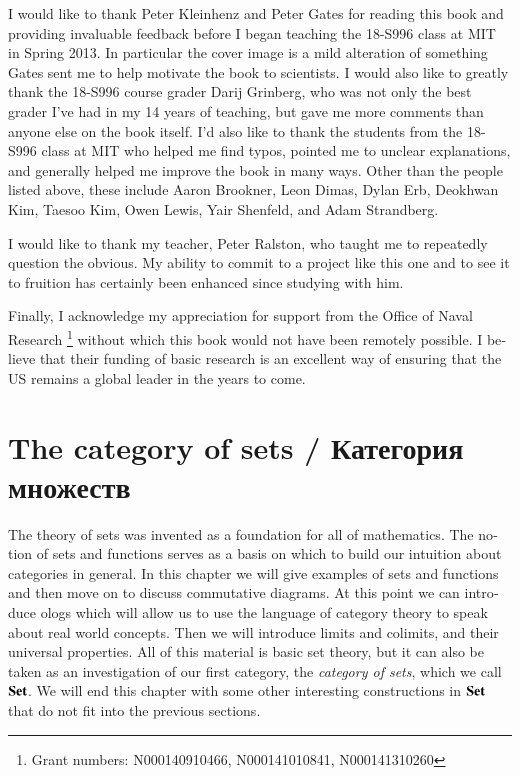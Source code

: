 \documentclass{book}
\def\Set{{\bf Set}}
\theoremstyle{theoremENG}
\theoremstyle{lemmaENG}
\theoremstyle{propositionENG}
\theoremstyle{corollaryENG}
\theoremstyle{factENG}
\theoremstyle{remarkENG}
\theoremstyle{exampleENG}
\theoremstyle{warningENG}
\theoremstyle{questionENG}
\theoremstyle{guessENG}
\theoremstyle{answerENG}
\theoremstyle{constructionENG}
\theoremstyle{rulesENG}
\theoremstyle{excENG}
\theoremstyle{appENG}
\theoremstyle{definitionENG}
\theoremstyle{notationENG}
\theoremstyle{conjectureENG}
\theoremstyle{postulateENG}
\theoremstyle{theoremRUS}
\theoremstyle{lemmaRUS}
\theoremstyle{propositionRUS}
\theoremstyle{corollaryRUS}
\theoremstyle{factRUS}
\theoremstyle{remarkRUS}
\theoremstyle{exampleRUS}
\theoremstyle{warningRUS}
\theoremstyle{questionRUS}
\theoremstyle{guessRUS}
\theoremstyle{answerRUS}
\theoremstyle{constructionRUS}
\theoremstyle{rulesRUS}
\theoremstyle{excRUS}
\theoremstyle{appRUS}
\theoremstyle{definitionRUS}
\theoremstyle{notationRUS}
\theoremstyle{conjectureRUS}
\theoremstyle{postulateRUS}
\begin{document}
\begin{english}
\begin{russian} \end{russian}

I would like to thank Peter Kleinhenz and Peter Gates for reading this book and providing invaluable feedback before I began teaching the 18-S996 class at MIT in Spring 2013. In particular the cover image is a mild alteration of something Gates sent me to help motivate the book to scientists. I would also like to greatly thank the 18-S996 course grader Darij Grinberg, who was not only the best grader I've had in my 14 years of teaching, but gave me more comments than anyone else on the book itself. I'd also like to thank the students from the 18-S996 class at MIT who helped me find typos, pointed me to unclear explanations, and generally helped me improve the book in many ways. Other than the people listed above, these include Aaron Brookner, Leon Dimas, Dylan Erb, Deokhwan Kim, Taesoo Kim, Owen Lewis, Yair Shenfeld, and Adam Strandberg.

\begin{russian} \end{russian}

I would like to thank my teacher, Peter Ralston, who taught me to repeatedly question the obvious. My ability to commit to a project like this one and to see it to fruition has certainly been enhanced since studying with him.

\begin{russian} \end{russian}

Finally, I acknowledge my appreciation for support from the Office of Naval Research
\footnote{Grant numbers: N000140910466, N000141010841, N000141310260}
without which this book would not have been remotely possible. I believe that their funding of basic research is an excellent way of ensuring that the US remains a global leader in the years to come.

\begin{russian} \end{russian}



\chapter{The category of sets / Категория множеств}\label{chap:sets}

The theory of sets was invented as a foundation for all of mathematics. The notion of sets and functions serves as a basis on which to build our intuition about categories in general. In this chapter we will give examples of sets and functions and then move on to discuss commutative diagrams. At this point we can introduce ologs which will allow us to use the language of category theory to speak about real world concepts. Then we will introduce limits and colimits, and their universal properties. All of this material is basic set theory, but it can also be taken as an investigation of our first category, the {\em category of sets}, which we call $\Set$. We will end this chapter with some other interesting constructions in $\Set$ that do not fit into the previous sections.


\end{english}
\end{document}
